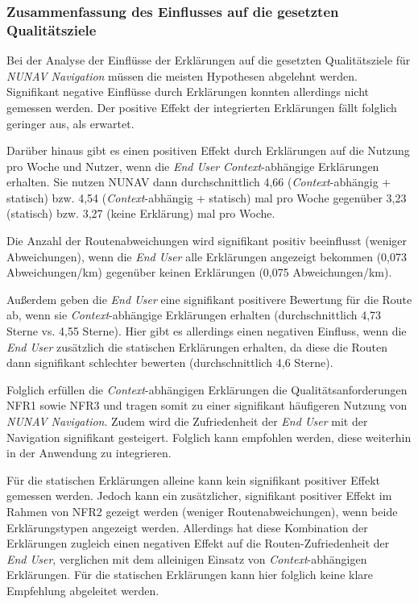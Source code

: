 \subsubsection{Zusammenfassung des Einflusses auf die gesetzten Qualitätsziele}

Bei der Analyse der Einflüsse der Erklärungen auf die gesetzten Qualitätsziele für \textit{NUNAV Navigation} müssen die meisten Hypothesen abgelehnt werden. Signifikant negative Einflüsse durch Erklärungen konnten allerdings nicht gemessen werden. Der positive Effekt der integrierten Erklärungen fällt folglich geringer aus, als erwartet. 

Darüber hinaus gibt es einen positiven Effekt durch Erklärungen auf die Nutzung pro Woche und Nutzer, wenn die \textit{End User} \textit{Context}-abhängige Erklärungen erhalten. Sie nutzen NUNAV dann durchschnittlich 4,66 (\textit{Context}-abhängig + statisch) bzw. 4,54 (\textit{Context}-abhängig + statisch) mal pro Woche gegenüber 3,23 (statisch) bzw. 3,27 (keine Erklärung) mal pro Woche.

Die Anzahl der Routenabweichungen wird signifikant positiv beeinflusst (weniger Abweichungen), wenn die \textit{End User} alle Erklärungen angezeigt bekommen (0,073 Abweichungen/km) gegenüber keinen Erklärungen (0,075 Abweichungen/km). 

Außerdem geben die \textit{End User} eine signifikant positivere Bewertung für die Route ab, wenn sie \textit{Context}-abhängige Erklärungen erhalten (durchschnittlich 4,73 Sterne vs. 4,55 Sterne). Hier gibt es allerdings einen negativen Einfluss, wenn die \textit{End User} zusätzlich die statischen Erklärungen erhalten, da diese die Routen dann signifikant schlechter bewerten (durchschnittlich 4,6 Sterne).

Folglich erfüllen die \textit{Context}-abhängigen Erklärungen die Qualitätsanforderungen NFR1 sowie NFR3 und tragen somit zu einer signifikant häufigeren Nutzung von \textit{NUNAV Navigation}. Zudem wird die Zufriedenheit der \textit{End User} mit der Navigation signifikant gesteigert. Folglich kann empfohlen werden, diese weiterhin in der Anwendung zu integrieren.

Für die statischen Erklärungen alleine kann kein signifikant positiver Effekt gemessen werden. Jedoch kann ein zusätzlicher, signifikant positiver Effekt im Rahmen von NFR2 gezeigt werden (weniger Routenabweichungen), wenn beide Erklärungstypen angezeigt werden. Allerdings hat diese Kombination der Erklärungen zugleich einen negativen Effekt auf die Routen-Zufriedenheit der \textit{End User}, verglichen mit dem alleinigen Einsatz von \textit{Context}-abhängigen Erklärungen. Für die statischen Erklärungen kann hier folglich keine klare Empfehlung abgeleitet werden.

\newpage